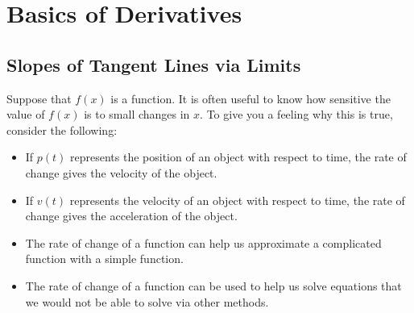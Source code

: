 \chapter{Basics of Derivatives}


\section{Slopes of Tangent Lines via Limits}


Suppose that $f(x)$ is a function.  It is often useful to know how
sensitive the value of $f(x)$ is to small changes in $x$. To give you
a feeling why this is true, consider the following:
\begin{itemize}
\item If $p(t)$ represents the position of an object with respect to
  time, the rate of change gives the velocity of the object.
\item If $v(t)$ represents the velocity of an object with respect to
  time, the rate of change gives the acceleration of the object.
\item The rate of change of a function can help us approximate a
  complicated function with a simple function.
\item The rate of change of a function can be used to help us solve
  equations that we would not be able to solve via other methods.
\end{itemize}

